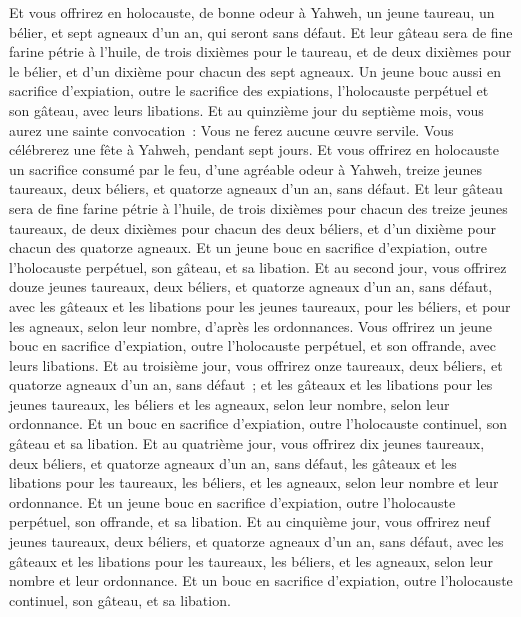 \begin{multicols}{2}
Et vous offrirez en holocauste, de bonne odeur à Yahweh, un jeune taureau, un bélier, et sept agneaux d'un an, qui seront sans défaut.
Et leur gâteau sera de fine farine pétrie à l'huile, de trois dixièmes pour le taureau, et de deux dixièmes pour le bélier,
et d'un dixième pour chacun des sept agneaux.
Un jeune bouc aussi en sacrifice d'expiation, outre le sacrifice des expiations, l'holocauste perpétuel et son gâteau, avec leurs libations.
Et au quinzième jour du septième mois, vous aurez une sainte convocation~: Vous ne ferez aucune œuvre servile. Vous célébrerez une fête à Yahweh, pendant sept jours.
Et vous offrirez en holocauste un sacrifice consumé par le feu, d'une agréable odeur à Yahweh, treize jeunes taureaux, deux béliers, et quatorze agneaux d'un an, sans défaut.
Et leur gâteau sera de fine farine pétrie à l'huile, de trois dixièmes pour chacun des treize jeunes taureaux, de deux dixièmes pour chacun des deux béliers,
et d'un dixième pour chacun des quatorze agneaux.
Et un jeune bouc en sacrifice d'expiation, outre l'holocauste perpétuel, son gâteau, et sa libation.
Et au second jour, vous offrirez douze jeunes taureaux, deux béliers, et quatorze agneaux d'un an, sans défaut,
avec les gâteaux et les libations pour les jeunes taureaux, pour les béliers, et pour les agneaux, selon leur nombre, d'après les ordonnances.
Vous offrirez un jeune bouc en sacrifice d'expiation, outre l'holocauste perpétuel, et son offrande, avec leurs libations.
Et au troisième jour, vous offrirez onze taureaux, deux béliers, et quatorze agneaux d'un an, sans défaut~;
et les gâteaux et les libations pour les jeunes taureaux, les béliers et les agneaux, selon leur nombre, selon leur ordonnance.
Et un bouc en sacrifice d'expiation, outre l'holocauste continuel, son gâteau et sa libation.
Et au quatrième jour, vous offrirez dix jeunes taureaux, deux béliers, et quatorze agneaux d'un an, sans défaut,
les gâteaux et les libations pour les taureaux, les béliers, et les agneaux, selon leur nombre et leur ordonnance.
Et un jeune bouc en sacrifice d'expiation, outre l'holocauste perpétuel, son offrande, et sa libation.
Et au cinquième jour, vous offrirez neuf jeunes taureaux, deux béliers, et quatorze agneaux d'un an, sans défaut,
avec les gâteaux et les libations pour les taureaux, les béliers, et les agneaux, selon leur nombre et leur ordonnance.
Et un bouc en sacrifice d'expiation, outre l'holocauste continuel, son gâteau, et sa libation.

\end{multicols}

